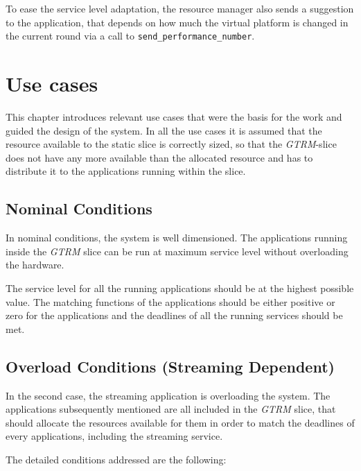 \documentclass[nobiblatex]{LTHthesis}
\begin{document}
To ease the service level adaptation, the resource manager also sends a
suggestion to the application, that depends on how much the virtual platform
is changed in the current round via a call to 
\texttt{send\_performance\_number}.

\chapter{Use cases}
\label{chp:usecases}

This chapter introduces relevant use cases that were the basis for the
work and guided the design of the system. In all the use cases it is assumed
that the resource available to the static slice is correctly sized, so that
the \emph{GTRM}-slice does not have any more available than the allocated resource
and has to distribute it to the applications running within the slice.

\section{Nominal Conditions}

In nominal conditions, the system is well dimensioned. The applications
running inside the \emph{GTRM} slice can be run at maximum service level without 
overloading the hardware.

The service level for all the running applications should be at the
highest possible value. The matching functions of the applications should
be either positive or zero for the applications and the deadlines of all
the running services should be met.

\section{Overload Conditions (Streaming Dependent)}

In the second case, the streaming application is overloading the system.
The applications subsequently mentioned are all included in the \emph{GTRM} slice,
that should allocate the resources available for them in order to match
the deadlines of every applications, including the streaming service.

The detailed conditions addressed are the following:
\end{document}
